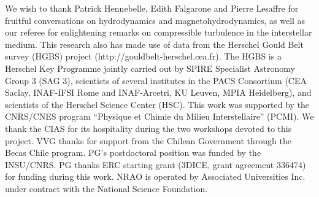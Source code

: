 \documentclass[structabstract]{aa}
\begin{document}
\begin{acknowledgements}
We wish to thank Patrick Hennebelle, Edith Falgarone and Pierre Lesaffre for fruitful conversations on hydrodynamics and magnetohydrodynamics, as well as our referee for enlightening remarks on compressible turbulence in the interstellar medium. This research also has made use of data from the Herschel Gould Belt survey (HGBS) project (http://gouldbelt-herschel.cea.fr). The HGBS is a Herschel Key Programme jointly carried out by SPIRE Specialist Astronomy Group 3 (SAG 3), scientists of several institutes in the PACS Consortium (CEA Saclay, INAF-IFSI Rome and INAF-Arcetri, KU Leuven, MPIA Heidelberg), and scientists of the Herschel Science Center (HSC). This work was supported by the CNRS/CNES program ``Physique et Chimie du Milieu Interstellaire'' (PCMI). We thank the CIAS for its hospitality during the two workshops devoted to this project. VVG thanks for support from the Chilean Government through the Becas Chile program. PG's postdoctoral position was funded by the INSU/CNRS. PG thanks ERC starting grant (3DICE, grant agreement 336474) for funding during this work. NRAO is operated by Associated 
Universities Inc. under contract with the National Science Foundation.


\end{acknowledgements}
\end{document}
